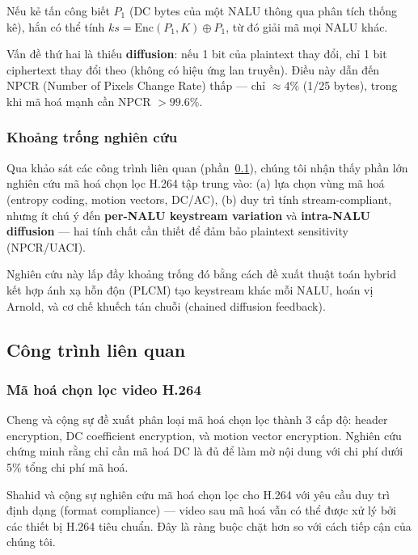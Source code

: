 Nếu kẻ tấn công biết $P_1$ (DC bytes của một NALU thông qua phân tích thống kê),
hắn có thể tính $ks = \text{Enc}(P_1, K) \oplus P_1$, từ đó giải mã mọi NALU khác.

Vấn đề thứ hai là thiếu \textbf{diffusion}: nếu 1 bit của plaintext thay đổi,
chỉ 1 bit ciphertext thay đổi theo (không có hiệu ứng lan truyền). Điều này dẫn
đến NPCR (Number of Pixels Change Rate) thấp --- chỉ $\approx 4\%$ (1/25 bytes),
trong khi mã hoá mạnh cần NPCR $> 99.6\%$.

\subsubsection{Khoảng trống nghiên cứu}

Qua khảo sát các công trình liên quan (phần~\ref{subsec:related_work}), chúng tôi
nhận thấy phần lớn nghiên cứu mã hoá chọn lọc H.264 tập trung vào:
(a) lựa chọn vùng mã hoá (entropy coding, motion vectors, DC/AC),
(b) duy trì tính stream-compliant,
nhưng ít chú ý đến \textbf{per-NALU keystream variation} và \textbf{intra-NALU diffusion}
--- hai tính chất cần thiết để đảm bảo plaintext sensitivity (NPCR/UACI).

Nghiên cứu này lấp đầy khoảng trống đó bằng cách đề xuất thuật toán hybrid
kết hợp ánh xạ hỗn độn (PLCM) tạo keystream khác mỗi NALU, hoán vị Arnold,
và cơ chế khuếch tán chuỗi (chained diffusion feedback).

\subsection{Công trình liên quan}
\label{subsec:related_work}

\subsubsection{Mã hoá chọn lọc video H.264}

Cheng và cộng sự \cite{cheng_selective} đề xuất phân loại mã hoá chọn lọc
thành 3 cấp độ: header encryption, DC coefficient encryption, và motion vector
encryption. Nghiên cứu chứng minh rằng chỉ cần mã hoá DC là đủ để làm mờ nội dung
với chi phí dưới 5\% tổng chi phí mã hoá.

Shahid và cộng sự \cite{shahid_selective} nghiên cứu mã hoá chọn lọc cho
H.264 với yêu cầu duy trì định dạng (format compliance) --- video sau mã hoá
vẫn có thể được xử lý bởi các thiết bị H.264 tiêu chuẩn. Đây là ràng buộc
chặt hơn so với cách tiếp cận của chúng tôi.

